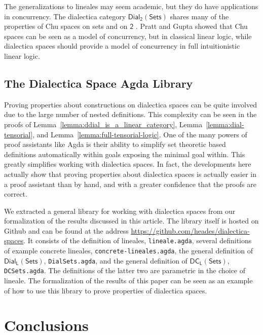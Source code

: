 \documentclass{elsarticle}
\newcommand{\dial}[0]{\mathsf{Dial_2}(\mathsf{Sets})}
\newcommand{\dialSets}[1]{\mathsf{Dial_{#1}}(\mathsf{Sets})}
\newcommand{\dcSets}[1]{\mathsf{DC_{#1}}(\mathsf{Sets})}
\begin{document}
The generalizations to lineales may seem academic, but they do have applications in concurrency.  %
The dialectica
category $\dial$ shares many  of the properties of Chu spaces  on sets and on
$\mathsf{2}$ \cite{dePaiva:2006}.  Pratt and Gupta showed that Chu
spaces can be seen as a model of concurrency, but in classical linear
logic, while dialectica spaces should provide a model of concurrency in full
intuitionistic linear logic.

\subsection{The Dialectica Space Agda Library}
\label{subsec:the_dialectica_space_agda_library}
Proving properties about constructions on dialectica spaces can be
quite involved due to the large number of nested definitions.  This
complexity can be seen in the proofs of
Lemma~\ref{lemma:ddial_is_a_linear_category},
Lemma~\ref{lemma:dial-tensorial}, and
Lemma~\ref{lemma:full-tensorial-logic}.  One of the many powers of
proof assistants like Agda is their ability to simplify set theoretic
based definitions automatically within goals exposing the minimal goal
within.  This greatly simplifies working with dialectica spaces.  In
fact, the developments here actually show that proving properties
about dialectica spaces is actually easier in a proof assistant than
by hand, and with a greater confidence that the proofs are correct.

We extracted a general library for working with dialectica spaces from
our formalization of the results discussed in this article. The
library itself is hosted on Github and can be found at the address
\url{https://github.com/heades/dialectica-spaces}.  It consists of the
definition of lineales, \verb!lineale.agda!, several definitions of
example concrete lineales, \verb!concrete-lineales.agda!, the general
definition of $\dialSets{L}$, \verb!DialSets.agda!, and the general
definition of $\dcSets{L}$, \verb!DCSets.agda!. The definitions of the
latter two are parametric in the choice of lineale.  The formalization
of the results of this paper can be seen as an example of how to use
this library to prove properties of dialectica spaces.

\section{Conclusions
}
\label{sec:conclusion_and_future_work}
\end{document}
